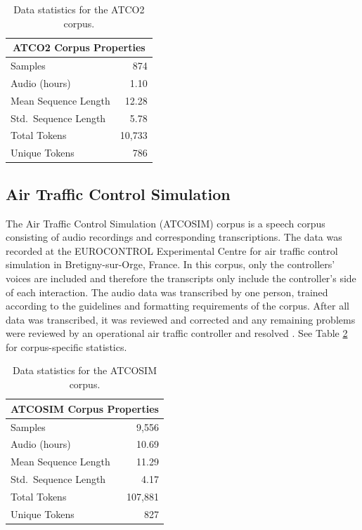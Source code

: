 \documentclass[12pt]{article}
\begin{document}
\begin{table}
    \centering
    \begin{tabular}{l r}
        \toprule
        \multicolumn{2}{c}{ATCO2 Corpus Properties} \\
        \midrule
        Samples              & 874                  \\
        Audio (hours)        & 1.10                 \\
        Mean Sequence Length & 12.28                \\
        Std.~Sequence Length & 5.78                 \\
        Total Tokens         & 10,733               \\
        Unique Tokens        & 786                  \\
        \bottomrule
    \end{tabular}
    \caption{Data statistics for the ATCO2 corpus.}
    \label{tab:atco2_stats}
\end{table}

\subsection{Air Traffic Control Simulation}\label{sec:atcosim}
The Air Traffic Control Simulation (ATCOSIM) corpus is a speech corpus consisting of audio recordings and corresponding transcriptions.
The data was recorded at the EUROCONTROL Experimental Centre for air traffic control simulation in Bretigny-sur-Orge, France. In this corpus, only the
controllers' voices are included and therefore the transcripts only include the controller's side of each interaction. The audio data was transcribed
by one person, trained according to the guidelines and formatting requirements of the corpus. After all data was transcribed, it was reviewed and
corrected and any remaining problems were reviewed by an operational air traffic controller and resolved \cite{hofbauer_atcosim_2008}. See Table
\ref{tab:atcosim_stats} for corpus-specific statistics.

\begin{table}
    \centering
    \begin{tabular}{l r}
        \toprule
        \multicolumn{2}{c}{ATCOSIM Corpus Properties} \\
        \midrule
        Samples              & 9,556                  \\
        Audio (hours)        & 10.69                  \\
        Mean Sequence Length & 11.29                  \\
        Std.~Sequence Length & 4.17                   \\
        Total Tokens         & 107,881                \\
        Unique Tokens        & 827                    \\
        \bottomrule
    \end{tabular}
    \caption{Data statistics for the ATCOSIM corpus.}
    \label{tab:atcosim_stats}
\end{table}
\end{document}
